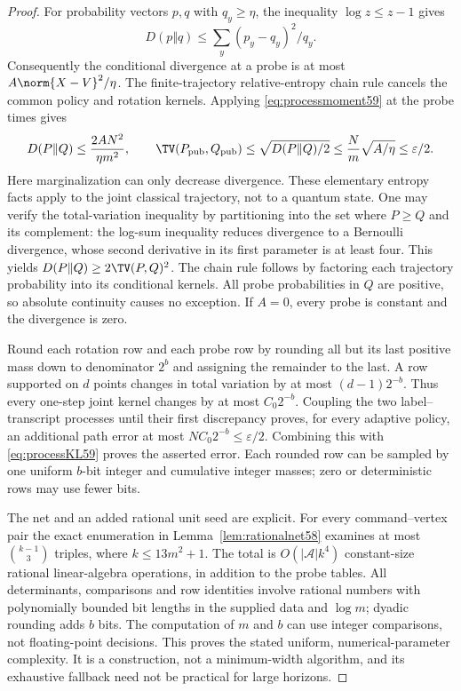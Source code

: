 \begin{proof}
For probability vectors $p,q$ with $q_y\ge\eta$, the inequality
$\log z\le z-1$ gives
\[
 D(p\Vert q)\le\sum_y(p_y-q_y)^2/q_y.
\]
Consequently the conditional divergence at a probe is at most
$A\norm{X-V}^2/\eta$. The finite-trajectory relative-entropy chain rule
cancels the common policy and rotation kernels. Applying
\eqref{eq:processmoment59} at the probe times gives
\begin{equation}\label{eq:processKL59}
 D(P\Vert Q)\le \frac{2AN^2}{\eta m^2},\qquad
 \TV(P_{\rm pub},Q_{\rm pub})
       \le\sqrt{D(P\Vert Q)/2}
       \le \frac Nm\sqrt{A/\eta}\le\varepsilon/2.
\end{equation}
Here marginalization can only decrease divergence. These elementary
entropy facts apply to the joint classical trajectory, not to a quantum
state. One may verify the total-variation inequality by partitioning
into the set where $P\ge Q$ and its complement: the log-sum inequality
reduces divergence to a Bernoulli divergence, whose second derivative
in its first parameter is at least four. This yields
$D(P\Vert Q)\ge2\TV(P,Q)^2$. The chain rule follows by factoring each
trajectory probability into its conditional kernels. All probe
probabilities in $Q$ are positive, so absolute continuity causes no
exception. If $A=0$, every probe is constant and the divergence is zero.

Round each rotation row and each probe row by rounding all but its last
positive mass down to denominator $2^b$ and assigning the remainder to
the last. A row supported on $d$ points changes in total variation by
at most $(d-1)2^{-b}$. Thus every one-step joint kernel changes by at most
$C_0 2^{-b}$. Coupling the two label--transcript processes until their
first discrepancy proves, for every adaptive policy, an additional
path error at most $NC_0 2^{-b}\le\varepsilon/2$. Combining this with
\eqref{eq:processKL59} proves the asserted error. Each rounded row can
be sampled by one uniform $b$-bit integer and cumulative integer masses;
zero or deterministic rows may use fewer bits.

The net and an added rational unit seed are explicit. For every
command--vertex pair the exact enumeration in
Lemma~\ref{lem:rationalnet58} examines at most $\binom{k-1}{3}$ triples,
where $k\le13m^2+1$. The total is $O(|\mathcal A|k^4)$ constant-size
rational linear-algebra operations, in addition to the probe tables.
All determinants, comparisons and row identities involve rational
numbers with polynomially bounded bit lengths in the supplied data and
$\log m$; dyadic rounding adds $b$ bits. The computation of $m$ and $b$
can use integer comparisons, not floating-point decisions. This proves
the stated uniform, numerical-parameter complexity. It is a construction,
not a minimum-width algorithm, and its exhaustive fallback need not be
practical for large horizons.
\end{proof}


